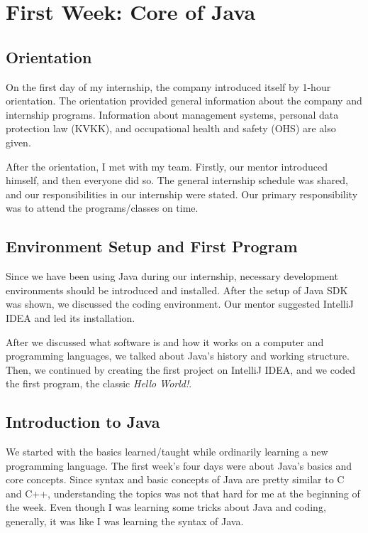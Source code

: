 \section{First Week: Core of Java}


\subsection{Orientation}

On the first day of my internship, the company introduced itself by 1-hour orientation. The orientation provided general information about the company and internship programs. Information about management systems, personal data protection law (KVKK), and occupational health and safety (OHS) are also given.

After the orientation, I met with my team. Firstly, our mentor introduced himself, and then everyone did so. The general internship schedule was shared, and our responsibilities in our internship were stated. Our primary responsibility was to attend the programs/classes on time.


\subsection{Environment Setup and First Program}

Since we have been using Java during our internship, necessary development environments should be introduced and installed. After the setup of Java SDK was shown, we discussed the coding environment. Our mentor suggested IntelliJ IDEA and led its installation.

After we discussed what software is and how it works on a computer and programming languages, we talked about Java's history and working structure. Then, we continued by creating the first project on IntelliJ IDEA, and we coded the first program, the classic \textit{Hello World!}.


\subsection{Introduction to Java}

We started with the basics learned/taught while ordinarily learning a new programming language. The first week's four days were about Java's basics and core concepts. Since syntax and basic concepts of Java are pretty similar to C and C++, understanding the topics was not that hard for me at the beginning of the week. Even though I was learning some tricks about Java and coding, generally, it was like I was learning the syntax of Java.

